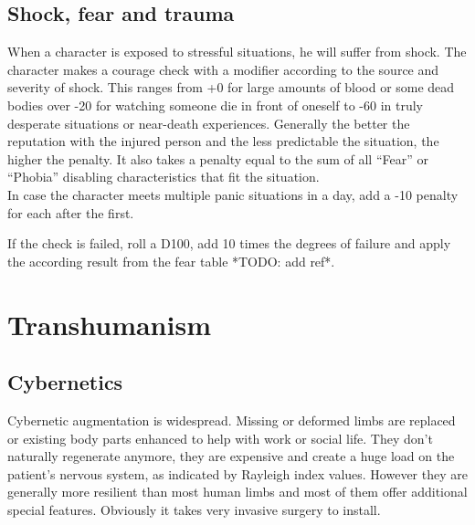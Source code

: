 \documentclass[12pt,a4paper]{book}
\begin{document}
	\section{Shock, fear and trauma}
	When a character is exposed to stressful situations, he will suffer from shock. The character makes a courage check with a modifier according to the source and severity of shock. This ranges from +0 for large amounts of blood or some dead bodies over -20 for watching someone die in front of oneself to -60 in truly desperate situations or near-death experiences. Generally the better the reputation with the injured person and the less predictable the situation, the higher the penalty. It also takes a penalty equal to the sum of all “Fear” or “Phobia” disabling characteristics that fit the situation.\\
	In case the character meets multiple panic situations in a day, add a -10 penalty for each after the first.
	
	If the check is failed, roll a D100, add 10 times the degrees of failure and apply the according result from the fear table *TODO: add ref*.
	\chapter{Transhumanism}
	\section{Cybernetics}
	Cybernetic augmentation is widespread. Missing or deformed limbs are replaced or existing body parts enhanced to help with work or social life. They don’t naturally regenerate anymore, they are expensive and create a huge load on the patient’s nervous system, as indicated by Rayleigh index values. However they are generally more resilient than most human limbs and most of them offer additional special features. Obviously it takes very invasive surgery to install.
\end{document}

